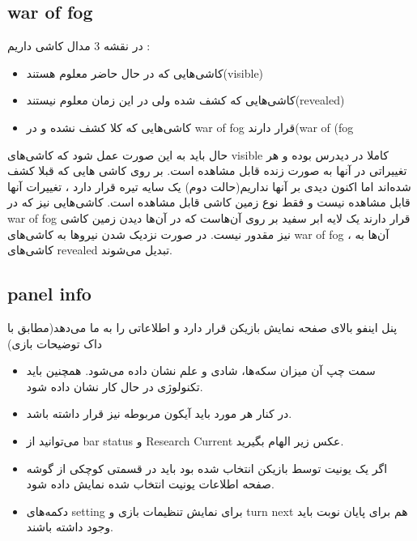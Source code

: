 \documentclass[]{article}
\begin{document}
\subsection*{{\titr war of fog}}

در نقشه 3 مدال کاشی داریم :

\begin{itemize}
    \item کاشی‌هایی که در حال حاضر معلوم هستند(visible)
\item کاشی‌هایی که کشف شده ولی در این زمان معلوم نیستند(revealed)
\item کاشی‌هایی که کلا کشف نشده و در war of fog قرار دارند(war of (fog
\end{itemize}

 حال باید به این صورت عمل شود که کاشی‌های visible کاملا در دیدرس بوده و هر تغییراتی در آنها به صورت زنده قابل مشاهده است.
بر روی کاشی هایی که قبلا کشف شده‌اند اما اکنون دیدی بر آنها نداریم(حالت دوم) یک سایه تیره قرار دارد ، تغییرات آنها قابل مشاهده نیست و فقط نوع زمین کاشی قابل مشاهده است.
کاشی‌هایی نیز که در war of fog قرار دارند یک لایه ابر سفید بر روی آن‌هاست که در آن‌ها دیدن زمین کاشی نیز مقدور نیست.
در صورت نزدیک شدن نیروها به کاشی‌های war of fog ، آن‌ها به کاشی‌های revealed تبدیل می‌شوند.






\subsection*{{\titr panel info}}
پنل اینفو بالای صفحه نمایش بازیکن قرار دارد و اطلاعاتی را به ما می‌دهد(مطابق با داک توضیحات بازی)

\begin{itemize}
\item  سمت چپ آن میزان سکه‌ها، شادی و علم نشان داده می‌شود. همچنین باید تکنولوژی در حال کار نشان داده شود.

\item در کنار هر مورد باید آیکون مربوطه نیز قرار داشته باشد.

\item می‌توانید از bar status و Research Current عکس زیر الهام بگیرید.

\item اگر یک یونیت توسط بازیکن انتخاب شده بود باید در قسمتی کوچکی از گوشه صفحه اطلاعات یونیت انتخاب شده نمایش داده شود.

\item دکمه‌های setting برای نمایش تنظیمات بازی و turn next هم برای پایان نوبت باید وجود داشته باشند. 

\end{itemize}
\end{document}
